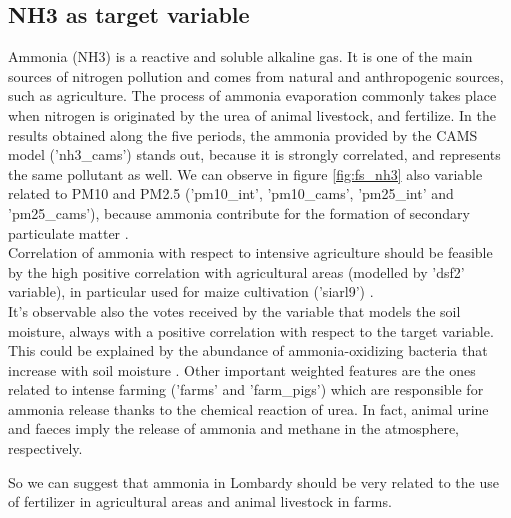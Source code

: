 \subsection{NH3 as target variable}
Ammonia (NH3) is a reactive and soluble alkaline gas. It is one of the main sources of nitrogen pollution and comes from natural and anthropogenic sources, such as agriculture.
The process of ammonia evaporation commonly takes place when nitrogen is originated by the urea of animal livestock, and fertilize. 
In the results obtained along the five periods, the ammonia provided by the CAMS model ('nh3\_cams') stands out, because it is strongly correlated, and represents the same pollutant as well.
We can observe in figure \ref{fig:fs_nh3} also variable related to PM10 and PM2.5 ('pm10\_int', 'pm10\_cams', 'pm25\_int' and 'pm25\_cams'), because ammonia contribute for the formation of secondary particulate matter \cite{dai2019concentrations}\cite{zhu2015sources}.\\
Correlation of ammonia with respect to intensive agriculture should be feasible by the high positive correlation with agricultural areas (modelled by 'dsf2' variable), in particular used for maize cultivation ('siarl9') .\\
It's observable also the votes received by the variable that models the soil moisture, always with a positive correlation with respect to the target variable. This could be explained by the abundance of ammonia-oxidizing bacteria that increase with soil moisture \cite{avrahami2007response}.  
Other important weighted features are the ones related to intense farming ('farms' and 'farm\_pigs') which are responsible for ammonia release thanks to the chemical reaction of urea.
In fact, animal urine and faeces imply the release of ammonia and methane in the atmosphere, respectively\cite{saggar2004review}.

So we can suggest that ammonia in Lombardy should be very related to the use of fertilizer in agricultural areas and animal livestock in farms.
